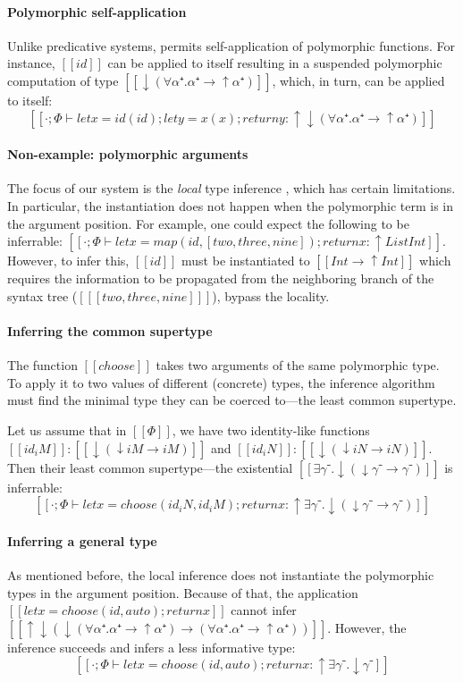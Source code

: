 \paragraph*{Polymorphic self-application}
  Unlike predicative systems, \fexists permits self-application of polymorphic
  functions. For instance, $[[id]]$ can be applied to itself resulting in a
  suspended polymorphic computation of type $[[↓(∀α⁺.α⁺ → ↑α⁺)]]$, which, in
  turn, can be applied to itself:
  $$[[· ; Φ ⊢ let x = id(id); let y = x(x); return y : ↑↓(∀α⁺.α⁺ → ↑α⁺)]]$$


\paragraph*{Non-example: polymorphic arguments}
The focus of our system is the \emph{local} type inference
\cite{pierce2000:local}, which has certain limitations. In particular, the
instantiation does not happen when the polymorphic term is in the argument
position. For example, one could expect the following to be inferrable:
\mbox{$[[· ; Φ ⊢ let x = map(id, [two, three, nine]); return x : ↑ List Int]]$}.
However, to infer this, $[[id]]$ must be instantiated to \mbox{$[[Int → ↑Int]]$}
which requires the information to be propagated from the neighboring branch of
the syntax tree (\mbox{$[[ [two, three, nine] ]]$}), \ie bypass the locality. 


\paragraph*{Inferring the common supertype}
  The function $[[choose]]$ takes two arguments of the same
  polymorphic type. To apply it to two values of different (concrete) types, 
  the inference algorithm must find the minimal type they can be coerced 
  to---the least common supertype.

  Let us assume that in $[[Φ]]$, we have two identity-like functions 
  \mbox{$[[id_iM]] : [[↓(↓iM → iM)]]$} and \mbox{$[[id_iN]] : [[↓(↓iN → iN)]]$}.
  Then their least common supertype---the existential $[[∃γ⁻.↓(↓γ⁻ → γ⁻)]]$
  is inferrable:
  $$[[· ; Φ ⊢ let x = choose (id_iN, id_iM); return x : ↑ ∃γ⁻.↓(↓γ⁻ → γ⁻)]]$$

\paragraph*{Inferring a general type}
  As mentioned before, the local inference does not instantiate the polymorphic
  types in the argument position.
  Because of that, the application 
  \mbox{$[[let x = choose (id, auto); return x ]]$} cannot infer 
  $[[↑↓(↓(∀α⁺.α⁺ → ↑α⁺) → (∀α⁺.α⁺ → ↑α⁺))]]$.
  However, the inference succeeds and infers a less informative type:
  $$[[· ; Φ ⊢ let x = choose (id, auto); return x : ↑ ∃γ⁻.↓γ⁻]]$$

